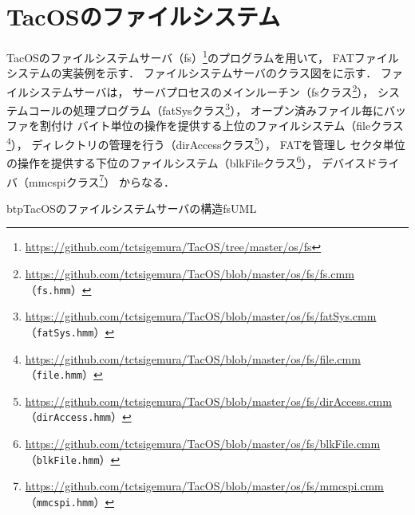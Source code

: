 \chapter{TacOSのファイルシステム}
\label{tacosFAT}

TacOSのファイルシステムサーバ（fs）\footnote{
  \url{https://github.com/tctsigemura/TacOS/tree/master/os/fs}
}のプログラムを用いて，
FATファイルシステムの実装例を示す．
ファイルシステムサーバのクラス図をに示す．
ファイルシステムサーバは，
サーバプロセスのメインルーチン（fsクラス\footnote{
  \url{https://github.com/tctsigemura/TacOS/blob/master/os/fs/fs.cmm}
  （\texttt{fs.hmm}）}），
システムコールの処理プログラム（fatSysクラス\footnote{
  \url{https://github.com/tctsigemura/TacOS/blob/master/os/fs/fatSys.cmm}
  （\texttt{fatSys.hmm}）}），
オープン済みファイル毎にバッファを割付け
バイト単位の操作を提供する上位のファイルシステム（fileクラス\footnote{
  \url{https://github.com/tctsigemura/TacOS/blob/master/os/fs/file.cmm}
  （\texttt{file.hmm}）}），
ディレクトリの管理を行う（dirAccessクラス\footnote{
  \url{https://github.com/tctsigemura/TacOS/blob/master/os/fs/dirAccess.cmm}
  （\texttt{dirAccess.hmm}）}），
FATを管理し
セクタ単位の操作を提供する下位のファイルシステム（blkFileクラス\footnote{
  \url{https://github.com/tctsigemura/TacOS/blob/master/os/fs/blkFile.cmm}
  （\texttt{blkFile.hmm}）}），
デバイスドライバ（mmcspiクラス\footnote{
  \url{https://github.com/tctsigemura/TacOS/blob/master/os/fs/mmcspi.cmm}
  （\texttt{mmcspi.hmm}）}）
からなる．

\begin{myfig}{btp}{TacOSのファイルシステムサーバの構造}{fsUML}
\end{myfig}

